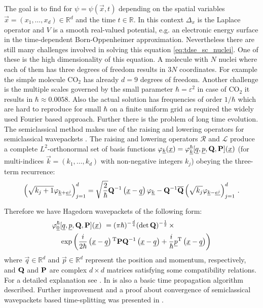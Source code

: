 The goal is to find for $\psi = \psi(\vec{x},t)$ depending on the spatial variables $\vec{x} = (x_{1},\ldots,x_{d}) \in \mathbb{R}^{d}$ and the time $t\in \mathbb{R}$. In this context $\Delta_{x}$ is the Laplace operator and $V$ is a smooth real-valued potential, e.g. an electronic energy surface in the time-dependent Born-Oppenheimer approximation. Nevertheless there are still many challenges involved in solving this equation \ref{eq:tdse_sc_nuclei}. One of these is the high dimensionality of this equation. A molecule with $N$ nuclei where each of them has three degrees of freedom results in $3N$ coordinates. For example the simple molecule $\mathrm{CO_{2}}$ has already $d=9$ degrees of freedom. Another challenge is the multiple scales governed by the small parameter $\hbar = \varepsilon^{2}$ in case of $\mathrm{CO_{2}}$ it results in $\hbar \approx 0.0058$. Also the actual solution has frequencies of order $1/\hbar$ which are hard to reproduce for small $\hbar$ on a finite uniform grid as required the widely used Fourier based approach. Further there is the problem of long time evolution.\\

The semiclassical method makes use of the raising and lowering operators for semiclassical wavepackets \cite{H_ladder_operators}. The raising and lowering operators $\mathcal{R}$ and $\mathcal{L}$ produce a complete $L^2$-orthonormal set of basis functions $\varphi_{\underline{k}}(\underline{x}) = \varphi_{\underline{k}}^\hbar[\underline{q},\underline{p},\mathbf{Q},\mathbf{P}](\underline{x})$ (for multi-indices $\vec{k} = (k_1,\dots,k_d)$ with non-negative integers $k_j$) obeying the three-term recurrence:
\begin{equation*}
          \left(\sqrt{k_{j}+1}\varphi_{\underline{k}+\underline{e^j}}\right)_{j=1}^{d}
          = \sqrt{\frac{2}{\hbar}} \mathbf{Q}{}^{-1} \left(\underline{x}-\underline{q}\right) \varphi_{\underline{k}} -
          \mathbf{Q}{}^{-1} \overline{\mathbf{Q}} \left(\sqrt{k_{j}} \varphi_{\underline{k}-\underline{e^j}}\right)_{j=1}^{d} \, .
\end{equation*}

Therefore we have Hagedorn wavepackets of the following form:
        \begin{equation*}
          \begin{split}
            \varphi_{\underline{0}}^\hbar & [\underline{q},\underline{p},\mathbf{Q},\mathbf{P}](\underline{x})\ =
            (\pi\hbar)^{-\frac{d}{4}} (\det \mathbf{Q})^{-\frac{1}{2}} \,\times \\
            & \exp\left(\frac{i}{2\hbar} \left(\underline{x}-\underline{q}\right){}^{\textnormal{T}} \mathbf{P}\mathbf{Q}{}^{-1} \left(\underline{x}-\underline{q}\right) +
              \frac{i}{\hbar} \underline{p}{}^{\textnormal{T}} \left(\underline{x}-\underline{q}\right) \right)
          \end{split}
        \end{equation*}
where $\vec{q}\in \mathbb{R}^d$ and $\vec{p}\in \mathbb{R}^d$ represent the position and momentum, respectively, and $\mathbf{Q}$ and $\mathbf{P}$ are complex $d\times d$ matrices satisfying some compatibility relations. For a detailed explanation see \cite{FGL_semiclassical_dynamics}. In \cite{FGL_semiclassical_dynamics} is also a basic time propagation algorithm described. Further improvement and a proof about convergence of semiclassical wavepackets based time-splitting was presented in \cite{GH_convsemiclassical}.\\

